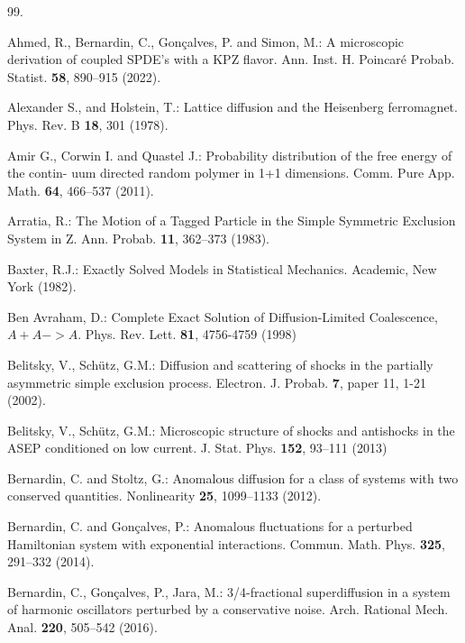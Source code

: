 \documentclass[12pt]{article}
\begin{document}
\begin{thebibliography}{99.}%

Ahmed, R., Bernardin, C., Gon{\c c}alves, P. and Simon, M.:
A microscopic derivation of coupled SPDE’s with a KPZ flavor.
Ann. Inst. H. Poincar\'e Probab. Statist. \textbf{58}, 890--915 (2022).

Alexander S., and Holstein, T.:
Lattice diffusion and the Heisenberg ferromagnet.
Phys. Rev. B {\bf 18}, 301 (1978).

Amir G., Corwin I. and Quastel J.: 
Probability distribution of the free energy of the contin- uum directed random polymer in 1+1 dimensions. 
Comm. Pure App. Math. \textbf{64}, 466--537 (2011).

Arratia, R.:
The Motion of a Tagged Particle in the Simple Symmetric Exclusion System in Z.
Ann. Probab. \textbf{11}, 362--373 (1983).

Baxter, R.J.:
Exactly Solved Models in Statistical Mechanics. 
Academic, New York (1982).

Ben Avraham, D.: 
Complete Exact Solution of Diffusion-Limited Coalescence, $A+A -> A$. 
Phys. Rev. Lett. \textbf{81}, 4756-4759 (1998)

Belitsky, V., Sch\"utz, G.M.: 
Diffusion and scattering of shocks in the partially asymmetric simple exclusion process.
Electron. J. Probab. \textbf{7}, paper 11, 1-21 (2002).

Belitsky, V., Sch\"utz, G.M.: 
Microscopic structure of shocks and antishocks in the ASEP conditioned on low current.
J. Stat. Phys. \textbf{152}, 93--111 (2013)

Bernardin, C. and Stoltz, G.: 
Anomalous diffusion for a class of systems with two conserved
quantities. Nonlinearity \textbf{25}, 1099--1133 (2012).

Bernardin, C. and Gon{\c c}alves, P.:
Anomalous fluctuations for a perturbed Hamiltonian system with exponential interactions.
Commun. Math. Phys. {\bf 325}, 291--332 (2014).

Bernardin, C., Gon{\c c}alves, P., Jara, M.:
3/4-fractional superdiffusion in a system of harmonic oscillators 
perturbed by a conservative noise.
Arch. Rational Mech. Anal. \textbf{220}, 505--542 (2016).


\end{thebibliography}
\end{document}
